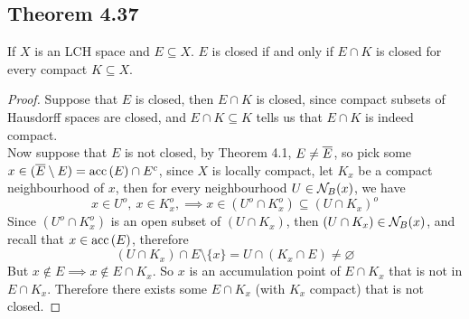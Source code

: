 \documentclass[../../main.tex]{subfiles}
\begin{document}
\subsection{Theorem 4.37}
\begin{wts}
    If $X$ is an LCH space and $E\subseteq X$. $E$ is closed if and only if $E\cap K$ is closed for every compact $K\subseteq X$.
\end{wts}
\begin{proof}
    Suppose that $E$ is closed, then $E\cap K$ is closed, since compact subsets of Hausdorff spaces are closed, and $E\cap K\subseteq K$ tells us that $E\cap K$ is indeed compact.\\
    
    Now suppose that $E$ is not closed, by Theorem 4.1, $E\neq \overline{E}$, so pick some $x\in (\overline{E}\setminus E)=\operatorname{acc}{(E)}\cap E^c$, since $X$ is locally compact, let $K_x$ be a compact neighbourhood of $x$, then for every neighbourhood $U\in\mathcal{N}_B({x})$, we have
    \[
    x\in U^o,\:x\in K_x^o,\implies x\in (U^o\cap K_x^o)\subseteq (U\cap K_x)^o
    \]
    Since $(U^o\cap K_x^o)$ is an open subset of $(U\cap K_x)$, then $(U\cap K_x)\in\mathcal{N}_B({x})$, and recall that $x\in \operatorname{acc}{(E)}$, therefore
    \[
    (U\cap K_x)\cap E\setminus\{x\}=U\cap(K_x\cap E)\neq\varnothing
    \]
    But $x\notin E\implies x\notin E\cap K_x$. So $x$ is an accumulation point of $E\cap K_x$ that is not in $E\cap K_x$. Therefore there exists some $E\cap K_x$ (with $K_x$ compact) that is not closed.
\end{proof}
\end{document}
